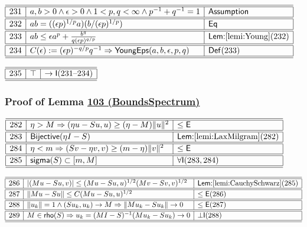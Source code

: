 \documentclass[11pt,reqno]{amsart}
\begin{document}
\noindent$%
\begin{array}{|r|l|l|}
\hline\hline
231 & a,b>0\wedge\epsilon>0\wedge1<p,q<\infty\wedge p^{-1}+q^{-1}=1 & \textsf{Assumption} \\ \hline\hline
232 & ab=((\epsilon p)^{1/p}a)(b/(\epsilon p)^{1/p}) & \mathsf{Eq} \\ \hline\hline
233 & ab\le\epsilon a^{p}+\tfrac{b^{q}}{q(\epsilon p)^{q/p}} & \textsf{Lem:}\ref{lemi:Young}(232) \\ \hline\hline
234 & C(\epsilon):=(\epsilon p)^{-q/p}q^{-1}\Rightarrow\mathsf{YoungEps}(a,b,\epsilon,p,q) & \mathsf{Def}(233) \\ \hline\hline
\end{array}%
$

\medskip

\noindent$%
\begin{array}{|r|l|l|}
\hline\hline
235 & \top & \to\mathsf{I}(231\text{--}234) \\ \hline\hline
\end{array}%
$

\medskip

\subsubsection*{Proof of Lemma \hyperlink{lem:BoundsSpectrum}{103 (\textsf{BoundsSpectrum})}}

\noindent$%
\begin{array}{|r|l|l|}
\hline\hline
282 & \eta>M\Rightarrow(\eta u-Su,u)\ge(\eta-M)\|u\|^{2} & \le\mathsf{E} \\ \hline\hline
283 & \mathsf{Bijective}(\eta I-S) & \textsf{Lem:}\ref{lemi:LaxMilgram}(282) \\ \hline\hline
284 & \eta<m\Rightarrow(Sv-\eta v,v)\ge(m-\eta)\|v\|^{2} & \le\mathsf{E} \\ \hline\hline
285 & \mathsf{sigma}(S)\subset[m,M] & \forall\mathsf{I}(283,284) \\ \hline\hline
\end{array}%
$

\medskip

\noindent$%
\begin{array}{|r|l|l|}
\hline\hline
286 & |(Mu-Su,v)|\le(Mu-Su,u)^{1/2}(Mv-Sv,v)^{1/2} & \textsf{Lem:}\ref{lemi:CauchySchwarz}(285) \\ \hline\hline
287 & \|Mu-Su\|\le C(Mu-Su,u)^{1/2} & \le\mathsf{E}(286) \\ \hline\hline
288 & \|u_{k}\|=1\wedge(Su_{k},u_{k})\to M\Rightarrow\|Mu_{k}-Su_{k}\|\to0 & \le\mathsf{E}(287) \\ \hline\hline
289 & M\in\mathsf{rho}(S)\Rightarrow u_{k}=(MI-S)^{-1}(Mu_{k}-Su_{k})\to0 & \bot\mathsf{I}(288) \\ \hline\hline
\end{array}%
$
\end{document}
